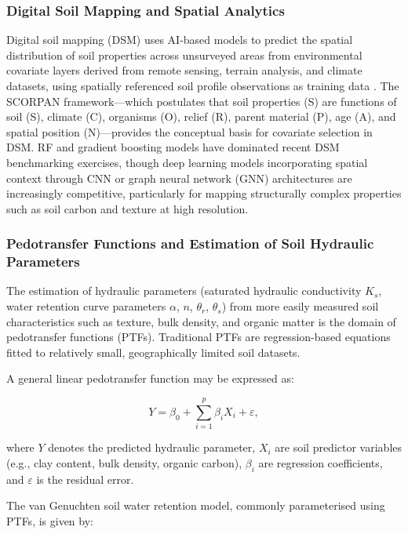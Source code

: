 \documentclass[land,article,submit,pdftex,moreauthors]{Definitions/mdpi}
\numberwithin{equation}{section}
\begin{document}
\subsubsection{Digital Soil Mapping and Spatial Analytics}

Digital soil mapping (DSM) uses AI-based models to predict the spatial distribution of soil properties across unsurveyed areas from environmental covariate layers derived from remote sensing, terrain analysis, and climate datasets, using spatially referenced soil profile observations as training data \citep{mcbratney2003digital}. The SCORPAN framework---which postulates that soil properties (S) are functions of soil (S), climate (C), organisms (O), relief (R), parent material (P), age (A), and spatial position (N)---provides the conceptual basis for covariate selection in DSM. RF and gradient boosting models have dominated recent DSM benchmarking exercises, though deep learning models incorporating spatial context through CNN or graph neural network (GNN) architectures are increasingly competitive, particularly for mapping structurally complex properties such as soil carbon and texture at high resolution.

\subsubsection{Pedotransfer Functions and Estimation of Soil Hydraulic Parameters}

The estimation of hydraulic parameters (saturated hydraulic conductivity $K_s$, water retention curve parameters $\alpha$, $n$, $\theta_r$, $\theta_s$) from more easily measured soil characteristics such as texture, bulk density, and organic matter is the domain of pedotransfer functions (PTFs). Traditional PTFs are regression-based equations fitted to relatively small, geographically limited soil datasets.

A general linear pedotransfer function may be expressed as:

\begin{equation}
Y
=
\beta_0
+
\sum_{i=1}^{p}
\beta_i X_i
+
\varepsilon,
\end{equation}

where $Y$ denotes the predicted hydraulic parameter, $X_i$ are soil predictor variables (e.g., clay content, bulk density, organic carbon), $\beta_i$ are regression coefficients, and $\varepsilon$ is the residual error.

The van Genuchten soil water retention model, commonly parameterised using PTFs, is given by:
\end{document}
